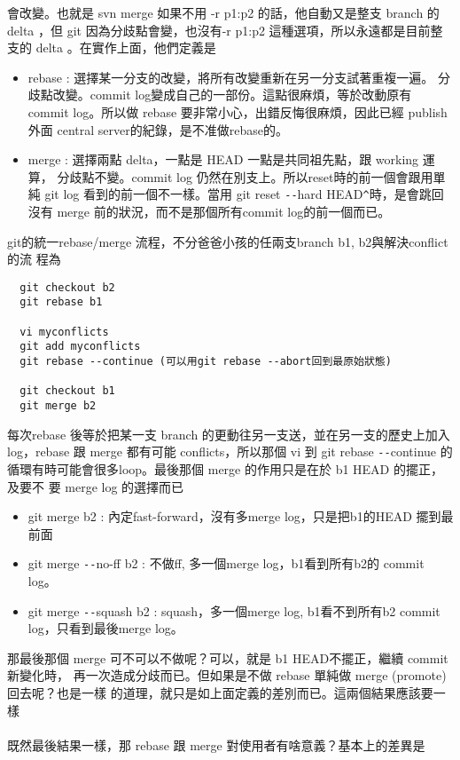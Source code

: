   會改變。也就是 svn merge 如果不用 -r p1:p2 的話，他自動又是整支 branch 的 delta
  ，但 git 因為分歧點會變，也沒有-r p1:p2 這種選項，所以永遠都是目前整支的 delta
  。在實作上面，他們定義是
  \begin{itemize}
    \item rebase : 選擇某一分支的改變，將所有改變重新在另一分支試著重複一遍。
      分歧點改變。commit log變成自己的一部份。這點很麻煩，等於改動原有 commit
      log。所以做 rebase 要非常小心，出錯反悔很麻煩，因此已經 publish 外面 central
      server的紀錄，是不准做rebase的。
    \item merge  : 選擇兩點 delta，一點是 HEAD 一點是共同祖先點，跟 working 運算，
      分歧點不變。commit log 仍然在別支上。所以reset時的前一個會跟用單純 git log
      看到的前一個不一樣。當用 git reset \verb=--=hard HEAD\verb=^=時，是會跳回沒有
      merge 前的狀況，而不是那個所有commit log的前一個而已。
  \end{itemize}
  git的統一rebase/merge 流程，不分爸爸小孩的任兩支branch b1, b2與解決conflict的流
  程為
  \begin{verbatim}
  git checkout b2
  git rebase b1

  vi myconflicts
  git add myconflicts
  git rebase --continue (可以用git rebase --abort回到最原始狀態)

  git checkout b1
  git merge b2
  \end{verbatim}
  每次rebase 後等於把某一支 branch 的更動往另一支送，並在另一支的歷史上加入
  log，rebase 跟 merge 都有可能 conflicts，所以那個 vi 到 git rebase \verb=--=continue
  的循環有時可能會很多loop。最後那個 merge 的作用只是在於 b1 HEAD 的擺正，及要不
  要 merge log 的選擇而已
  \begin{itemize}
    \item git merge b2 : 內定fast-forward，沒有多merge log，只是把b1的HEAD
      擺到最前面
    \item git merge \verb=--=no-ff b2 : 不做ff, 多一個merge log，b1看到所有b2的
      commit log。
    \item git merge \verb=--=squash b2 : squash，多一個merge log, b1看不到所有b2
      commit log，只看到最後merge log。
  \end{itemize}
  那最後那個 merge 可不可以不做呢？可以，就是 b1 HEAD不擺正，繼續 commit 新變化時，
  再一次造成分歧而已。但如果是不做 rebase 單純做 merge (promote)回去呢？也是一樣
  的道理，就只是如上面定義的差別而已。這兩個結果應該要一樣
  \\\\
  既然最後結果一樣，那 rebase 跟 merge 對使用者有啥意義？基本上的差異是
